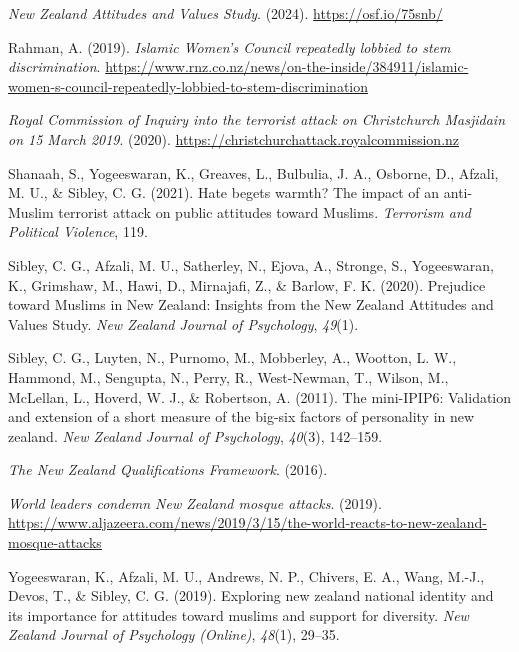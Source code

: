 \documentclass[
  man,
  longtable,
  nolmodern,
  notxfonts,
  notimes,
  colorlinks=true,linkcolor=blue,citecolor=blue,urlcolor=blue]{apa7}
\newlength{\cslhangindent}
\newenvironment{CSLReferences}[2] %
 {\begin{list}{}{%
  \setlength{\itemindent}{0pt}
  \setlength{\leftmargin}{0pt}
  \setlength{\parsep}{0pt}
  \ifodd #1
   \setlength{\leftmargin}{\cslhangindent}
   \setlength{\itemindent}{-1\cslhangindent}
  \fi
  \setlength{\itemsep}{#2\baselineskip}}}
 {\end{list}}
\begin{document}
\begin{CSLReferences}{1}{0}
\emph{New Zealand Attitudes and Values Study}. (2024).
\url{https://osf.io/75snb/}

Rahman, A. (2019). \emph{Islamic {W}omen's {C}ouncil repeatedly lobbied
to stem discrimination}.
\url{https://www.rnz.co.nz/news/on-the-inside/384911/islamic-women-s-council-repeatedly-lobbied-to-stem-discrimination}

\emph{Royal {C}ommission of {I}nquiry into the terrorist attack on
{C}hristchurch {M}asjidain on 15 {M}arch 2019}. (2020).
\url{https://christchurchattack.royalcommission.nz}

Shanaah, S., Yogeeswaran, K., Greaves, L., Bulbulia, J. A., Osborne, D.,
Afzali, M. U., \& Sibley, C. G. (2021). Hate begets warmth? The impact
of an anti-{M}uslim terrorist attack on public attitudes toward
{M}uslims. \emph{Terrorism and Political Violence}, 119.

Sibley, C. G., Afzali, M. U., Satherley, N., Ejova, A., Stronge, S.,
Yogeeswaran, K., Grimshaw, M., Hawi, D., Mirnajafi, Z., \& Barlow, F. K.
(2020). Prejudice toward {M}uslims in {N}ew {Z}ealand: Insights from the
{N}ew {Z}ealand {A}ttitudes and {V}alues {S}tudy. \emph{New Zealand
Journal of Psychology}, \emph{49}(1).

Sibley, C. G., Luyten, N., Purnomo, M., Mobberley, A., Wootton, L. W.,
Hammond, M., Sengupta, N., Perry, R., West-Newman, T., Wilson, M.,
McLellan, L., Hoverd, W. J., \& Robertson, A. (2011). The mini-IPIP6:
Validation and extension of a short measure of the big-six factors of
personality in new zealand. \emph{New Zealand Journal of Psychology},
\emph{40}(3), 142--159.

\emph{The New Zealand Qualifications Framework}. (2016).

\emph{World leaders condemn New Zealand mosque attacks}. (2019).
\url{https://www.aljazeera.com/news/2019/3/15/the-world-reacts-to-new-zealand-mosque-attacks}

Yogeeswaran, K., Afzali, M. U., Andrews, N. P., Chivers, E. A., Wang,
M.-J., Devos, T., \& Sibley, C. G. (2019). Exploring new zealand
national identity and its importance for attitudes toward muslims and
support for diversity. \emph{New Zealand Journal of Psychology
(Online)}, \emph{48}(1), 29--35.

\end{CSLReferences}
\end{document}
